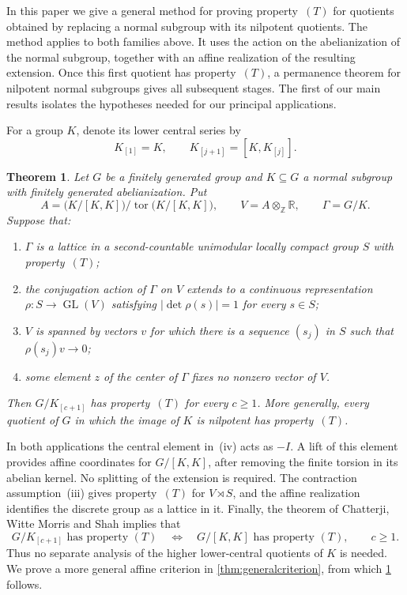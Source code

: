 \documentclass[11pt,a4paper]{article}
\newtheorem{maintheorem}{Theorem}
\theoremstyle{definition}
\newcommand{\R}{\mathbb R}
\newcommand{\Z}{\mathbb Z}
\newcommand{\GL}{\operatorname{GL}}
\newcommand{\tor}{\operatorname{tor}}
\newcommand{\rt}{(T)}
\begin{document}
In this paper we give a general method for proving property~\(\rt\)
for quotients obtained by replacing a normal subgroup with its
nilpotent quotients. The method applies to both families above.
It uses the action on the abelianization of the normal subgroup,
together with an affine realization of the resulting extension.
Once this first quotient has property~\(\rt\), a permanence theorem
for nilpotent normal subgroups gives all subsequent stages.
The first of our main results isolates the hypotheses needed for our
principal applications.

For a group \(K\), denote its lower central series by
\[
 K_{[1]}=K,\qquad K_{[j+1]}=[K,K_{[j]}].
\]

\begin{maintheorem}\label{thm:strategy}
Let \(G\) be a finitely generated group and \(K\subseteq G\)
a normal subgroup with finitely generated abelianization. Put
\[
 A=\bigl(K/[K,K]\bigr)/\tor\bigl(K/[K,K]\bigr),\qquad
 V=A\otimes_\Z\R,\qquad \Gamma=G/K.
\]
Suppose that:
\begin{enumerate}[label=\textup{(\roman*)}]
 \item \(\Gamma\) is a lattice in a second-countable unimodular
 locally compact group \(S\) with property~\(\rt\);
 \item the conjugation action of \(\Gamma\) on \(V\) extends to
 a continuous representation \(\rho:S\to\GL(V)\) satisfying
 \(\lvert\det\rho(s)\rvert=1\) for every \(s\in S\);
 \item \(V\) is spanned by vectors \(v\) for which there is a
 sequence \((s_j)\) in \(S\) such that \(\rho(s_j)v\to0\);
 \item some element \(z\) of the center of \(\Gamma\) fixes no
 nonzero vector of \(V\).
\end{enumerate}
Then \(G/K_{[c+1]}\) has property~\(\rt\) for every \(c\ge1\).
More generally, every quotient of \(G\) in which the image of \(K\)
is nilpotent has property~\(\rt\).
\end{maintheorem}

In both applications the central element in~(iv) acts as \(-I\).
A lift of this element provides affine coordinates for
\(G/[K,K]\), after removing the finite torsion in its abelian
kernel. No splitting of the extension is required.
The contraction assumption~(iii) gives property~\(\rt\) for
\(V\rtimes S\), and the affine realization identifies the
discrete group as a lattice in it. Finally, the theorem of
Chatterji, Witte Morris and Shah \cite{CWMS} implies that
\[
 G/K_{[c+1]}\text{ has property }\rt
 \quad\Longleftrightarrow\quad
 G/[K,K]\text{ has property }\rt,\qquad c\ge1.
\]
Thus no separate analysis of the higher lower-central quotients
of \(K\) is needed. We prove a more general affine criterion in
\cref{thm:generalcriterion}, from which \cref{thm:strategy} follows.
\end{document}
